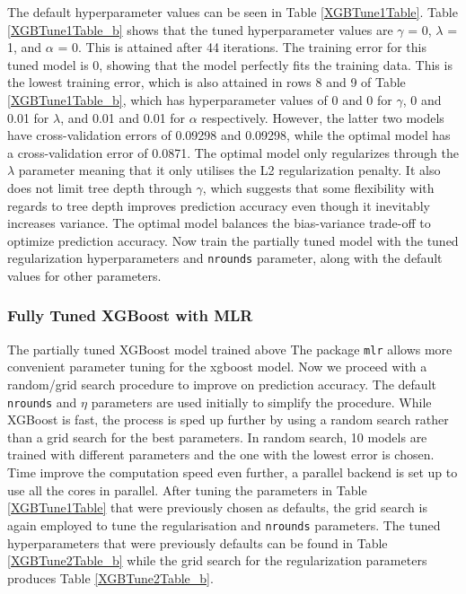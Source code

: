 \documentclass[11pt,preprint, authoryear]{elsarticle}
\numberwithin{equation}{section}
\numberwithin{figure}{section}
\numberwithin{table}{section}
\begin{document}
The default hyperparameter values can be seen in Table
\ref{XGBTune1Table}. Table \ref{XGBTune1Table_b} shows that the tuned
hyperparameter values are \(\gamma\) = 0, \(\lambda\) = 1, and
\(\alpha\) = 0. This is attained after 44 iterations. The training error
for this tuned model is 0, showing that the model perfectly fits the
training data. This is the lowest training error, which is also attained
in rows 8 and 9 of Table \ref{XGBTune1Table_b}, which has hyperparameter
values of 0 and 0 for \(\gamma\), 0 and 0.01 for \(\lambda\), and 0.01
and 0.01 for \(\alpha\) respectively. However, the latter two models
have cross-validation errors of 0.09298 and 0.09298, while the optimal
model has a cross-validation error of 0.0871. The optimal model only
regularizes through the \(\lambda\) parameter meaning that it only
utilises the L2 regularization penalty. It also does not limit tree
depth through \(\gamma\), which suggests that some flexibility with
regards to tree depth improves prediction accuracy even though it
inevitably increases variance. The optimal model balances the
bias-variance trade-off to optimize prediction accuracy. Now train the
partially tuned model with the tuned regularization hyperparameters and
\texttt{nrounds} parameter, along with the default values for other
parameters.

\hypertarget{fully-tuned-xgboost-with-mlr}{%
\subsubsection{Fully Tuned XGBoost with
MLR}\label{fully-tuned-xgboost-with-mlr}}

The partially tuned XGBoost model trained above The package \texttt{mlr}
allows more convenient parameter tuning for the xgboost model. Now we
proceed with a random/grid search procedure to improve on prediction
accuracy. The default \texttt{nrounds} and \(\eta\) parameters are used
initially to simplify the procedure. While XGBoost is fast, the process
is sped up further by using a random search rather than a grid search
for the best parameters. In random search, 10 models are trained with
different parameters and the one with the lowest error is chosen. Time
improve the computation speed even further, a parallel backend is set up
to use all the cores in parallel. After tuning the parameters in Table
\ref{XGBTune1Table} that were previously chosen as defaults, the grid
search is again employed to tune the regularisation and \texttt{nrounds}
parameters. The tuned hyperparameters that were previously defaults can
be found in Table \ref{XGBTune2Table_b} while the grid search for the
regularization parameters produces Table \ref{XGBTune2Table_b}.
\end{document}
